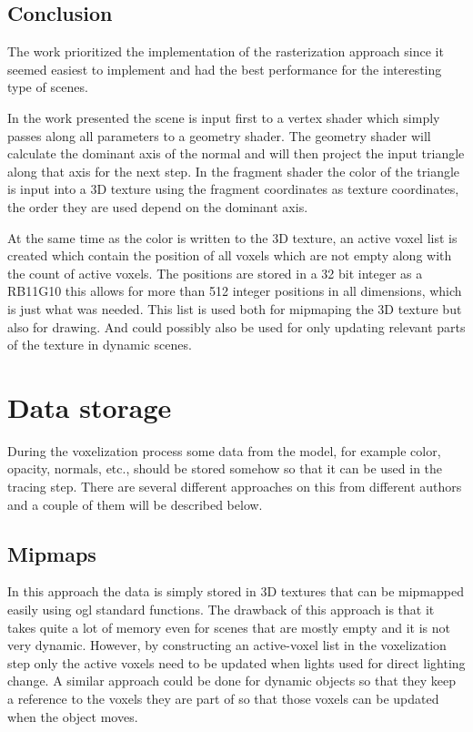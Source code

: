 \subsection{Conclusion}

The work prioritized the implementation of the rasterization approach since it seemed easiest to implement and had the best performance for the interesting type of scenes.

In the work presented the scene is input first to a vertex shader which simply passes along all parameters to a geometry shader. The geometry shader will calculate the dominant axis of the normal and will then project the input triangle along that axis for the next step. In the fragment shader the color of the triangle is input into a 3D texture using the fragment coordinates as texture coordinates, the order they are used depend on the dominant axis.

At the same time as the color is written to the 3D texture, an active voxel list is created which contain the position of all voxels which are not empty along with the count of active voxels. The positions are stored in a 32 bit integer as a RB11G10 this allows for more than 512 integer positions in all dimensions, which is just what was needed. This list is used both for mipmaping the 3D texture but also for drawing. And could possibly also be used for only updating relevant parts of the texture in dynamic scenes. 

\section{Data storage}

During the voxelization process some data from the model, for example color, opacity, normals, etc., should be stored somehow so that it can be used in the tracing step. There are several different approaches on this from different authors and a couple of them will be described below.

\subsection{Mipmaps}

In this approach the data is simply stored in 3D textures that can be mipmapped easily using \gls{ogl} standard functions. The drawback of this approach is that it takes quite a lot of memory even for scenes that are mostly empty and it is not very dynamic. However, by constructing an active-voxel list in the voxelization step only the active voxels need to be updated when lights used for direct lighting change. A similar approach could be done for dynamic objects so that they keep a reference to the voxels they are part of so that those voxels can be updated when the object moves.


